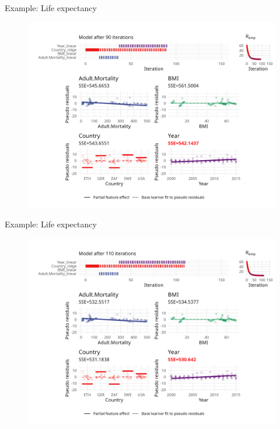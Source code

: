 \begin{frame}{Example: Life expectancy}
	\begin{figure}
		\centering
		\includegraphics[width=\textwidth]{figure/cwb-anim/fig-iter-0090.png}
	\end{figure}
	\addtocounter{framenumber}{-1}
\end{frame}


\begin{frame}{Example: Life expectancy}
	\begin{figure}
		\centering
		\includegraphics[width=\textwidth]{figure/cwb-anim/fig-iter-0110.png}
	\end{figure}
	\addtocounter{framenumber}{-1}
\end{frame}



